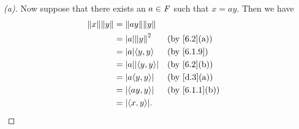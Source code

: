 \begin{proof}[(a)]
	Now suppose that there exists an \(a \in \mathit{F}\) such that \(x = ay\).
	Then we have
	\begin{align*}
		\norm{x} \norm{y} & = \norm{ay} \norm{y}                          \\
		                  & = \abs{a} \norm{y}^2       &  & \by{6.2}[a]   \\
		                  & = \abs{a} \inn{y, y}       &  & \by{6.1.9}    \\
		                  & = \abs{a} \abs{\inn{y, y}} &  & \by{6.2}[b]   \\
		                  & = \abs{a \inn{y, y}}       &  & \by{d.3}[a]   \\
		                  & = \abs{\inn{ay, y}}        &  & \by{6.1.1}[b] \\
		                  & = \abs{\inn{x, y}}.
	\end{align*}
\end{proof}

